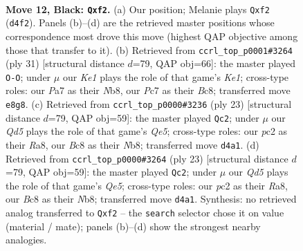 \documentclass[11pt]{article}
\begin{document}
\clearpage

\begin{figure}[p]\centering
\begin{subfigure}{0.46\textwidth}\centering
\resizebox{\linewidth}{!}{%
\newchessgame
\chessboard[
  setfen={1rb1k2r/p1pp1pp1/2p4p/8/3qP3/P2B4/P1P2PPP/R1QK3R b k - 3 12},
  showmover=false,
  pgfstyle=straightmove, color=movearrow, markmove={d4-f2}
]}
\caption{}
\end{subfigure}\hfill
\begin{subfigure}{0.46\textwidth}\centering
\resizebox{\linewidth}{!}{%
\newchessgame
\chessboard[
  setfen={rnb1k2r/3ppp1p/1p4p1/4q3/1PPN4/3BP3/1R1Q1PPP/4K2R b Kkq - 5 16},
  showmover=false,
  pgfstyle=straightmove, color=movearrow, markmove={e8-g8}
]}
\caption{}
\end{subfigure}
\\[4pt]
\begin{subfigure}{0.46\textwidth}\centering
\resizebox{\linewidth}{!}{%
\newchessgame
\chessboard[
  setfen={rn2k2r/ppp2ppp/3p4/5b2/3Pq3/P1P1BP2/3Q2PP/R3KB1R b KQkq - 0 12},
  showmover=false,
  pgfstyle=straightmove, color=movearrow, markmove={e4-c2}
]}
\caption{}
\end{subfigure}\hfill
\begin{subfigure}{0.46\textwidth}\centering
\resizebox{\linewidth}{!}{%
\newchessgame
\chessboard[
  setfen={rn2k2r/ppp2ppp/3p4/5b2/3Pq3/P1P1BP2/3Q2PP/R3KB1R b KQkq - 0 12},
  showmover=false,
  pgfstyle=straightmove, color=movearrow, markmove={e4-c2}
]}
\caption{}
\end{subfigure}
\caption{\textbf{Move 12, Black: \texttt{Qxf2}.} (a) Our position; Melanie plays \texttt{Qxf2} (\texttt{d4f2}). Panels (b)--(d) are the retrieved master positions whose correspondence most drove this move (highest QAP objective among those that transfer to it). (b) Retrieved from \texttt{ccrl\_top\_p0001\#3264} (ply 31) [structural distance $d$=79, QAP obj=66]: the master played \texttt{O-O}; under $\mu$ our \emph{Ke1} plays the role of that game's \emph{Ke1}; cross-type roles: our \emph{P}a7 as their \emph{N}b8, our \emph{P}c7 as their \emph{B}c8; transferred move \texttt{e8g8}. (c) Retrieved from \texttt{ccrl\_top\_p0000\#3236} (ply 23) [structural distance $d$=79, QAP obj=59]: the master played \texttt{Qc2}; under $\mu$ our \emph{Qd5} plays the role of that game's \emph{Qe5}; cross-type roles: our \emph{p}c2 as their \emph{R}a8, our \emph{B}c8 as their \emph{N}b8; transferred move \texttt{d4a1}. (d) Retrieved from \texttt{ccrl\_top\_p0000\#3264} (ply 23) [structural distance $d$=79, QAP obj=59]: the master played \texttt{Qc2}; under $\mu$ our \emph{Qd5} plays the role of that game's \emph{Qe5}; cross-type roles: our \emph{p}c2 as their \emph{R}a8, our \emph{B}c8 as their \emph{N}b8; transferred move \texttt{d4a1}. Synthesis: no retrieved analog transferred to \texttt{Qxf2} -- the \texttt{search} selector chose it on value (material / mate); panels (b)--(d) show the strongest nearby analogies.}
\label{fig:thought-m23}
\end{figure}
\end{document}
